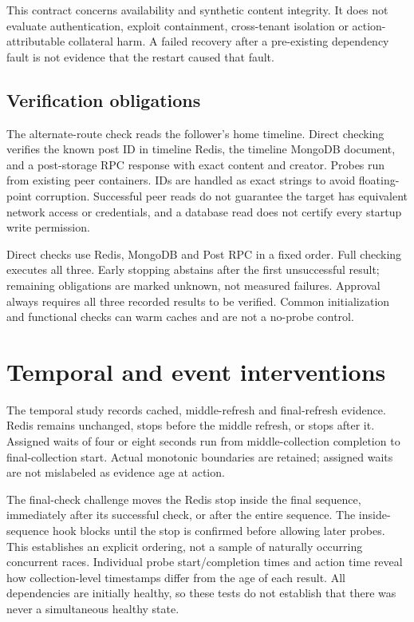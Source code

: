\documentclass[manuscript,review,nonacm]{acmart}
\begin{document}
This contract concerns availability and synthetic content integrity. It does not evaluate authentication, exploit containment, cross-tenant isolation or action-attributable collateral harm. A failed recovery after a pre-existing dependency fault is not evidence that the restart caused that fault.

\subsection{Verification obligations}
The alternate-route check reads the follower's home timeline. Direct checking verifies the known post ID in timeline Redis, the timeline MongoDB document, and a post-storage RPC response with exact content and creator. Probes run from existing peer containers. IDs are handled as exact strings to avoid floating-point corruption. Successful peer reads do not guarantee the target has equivalent network access or credentials, and a database read does not certify every startup write permission.

Direct checks use Redis, MongoDB and Post RPC in a fixed order. Full checking executes all three. Early stopping abstains after the first unsuccessful result; remaining obligations are marked unknown, not measured failures. Approval always requires all three recorded results to be verified. Common initialization and functional checks can warm caches and are not a no-probe control.

\section{Temporal and event interventions}
The temporal study records cached, middle-refresh and final-refresh evidence. Redis remains unchanged, stops before the middle refresh, or stops after it. Assigned waits of four or eight seconds run from middle-collection completion to final-collection start. Actual monotonic boundaries are retained; assigned waits are not mislabeled as evidence age at action.

The final-check challenge moves the Redis stop inside the final sequence, immediately after its successful check, or after the entire sequence. The inside-sequence hook blocks until the stop is confirmed before allowing later probes. This establishes an explicit ordering, not a sample of naturally occurring concurrent races. Individual probe start/completion times and action time reveal how collection-level timestamps differ from the age of each result. All dependencies are initially healthy, so these tests do not establish that there was never a simultaneous healthy state.
\end{document}
